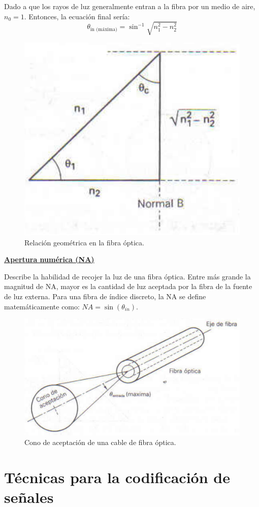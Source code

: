 \documentclass[10pt,a4paper]{article}
\begin{document}
Dado a que los rayos de luz generalmente entran a la fibra por un medio de aire, $n_0=1$. Entonces, la ecuación final sería:
\[\theta_\text{in (máxima)} = \sin^{-1} \sqrt{n_1^2 - n_2^2}\]

\begin{figure}[ht!]
  \caption{Relación geométrica en la fibra óptica.}
  \label{fig:pitagoras}  
  \centerline{
	\includegraphics[width=.4\textwidth-\fboxrule-\fboxrule]{imgs/pitagoras.jpg}}
\end{figure}
\pagebreak
\underline{\textbf{Apertura numérica (NA)}}

Describe la habilidad de recojer la luz de una fibra óptica. Entre más grande la magnitud de NA, mayor es la cantidad de luz aceptada por la fibra de la fuente de luz externa. Para una fibra de índice discreto, la NA se define matemáticamente como: $NA = \sin(\theta_{in})$.

\begin{figure}[ht!]
  \caption{Cono de aceptación de una cable de fibra óptica.}
  \label{fig:na}  
  \centerline{
	\includegraphics[width=.8\textwidth-\fboxrule-\fboxrule]{imgs/na.png}}
\end{figure}
 
 \pagebreak
\section{Técnicas para la codificación de señales}
\end{document}
